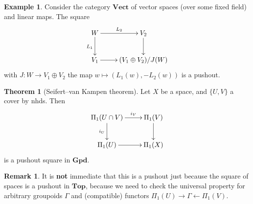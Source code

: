 \documentclass{tufte-handout}
\def\Top {\mathbf{Top}}
\def\Gpd {\mathbf{Gpd}}
\def\Vect {\mathbf{Vect}}
\theoremstyle{definition}
\newtheorem{example}{Example}
\newtheorem{theorem}{Theorem}
\newtheorem*{rem}{Remark}
\begin{document}
\begin{example}
Consider the category $\Vect$ of vector spaces (over some fixed field) and linear maps. The square
\[
	\xymatrix{
		W\ar[r]^{L_2} \ar[d]_{L_1} & V_2 \ar[d] \\
		V_1 \ar[r] & (V_1\oplus V_2)/J(W)
	}
\]
with $J\colon W\to V_1\oplus V_2$ the map $w\mapsto (L_1(w),-L_2(w))$ is a pushout.
\end{example}


\begin{theorem}[Seifert--van Kampen theorem]
Let $X$ be a space, and $\{U,V\}$ a cover by nhds. Then
\[
	\xymatrix{
		\Pi_1(U\cap V) \ar[r]^-{i_V} \ar[d]_{i_U} & \Pi_1(V) \ar[d]\\
		\Pi_1(U) \ar[r] & \Pi_1(X)
	}
\]
is a pushout square in $\Gpd$.
\end{theorem}

\begin{rem}
It is \textbf{not} immediate that this is a pushout just because the square of spaces is 
a pushout in $\Top$, because we need to check the universal property for arbitrary 
groupoids $\Gamma$ and (compatible) functors $\Pi_1(U) \to \Gamma \leftarrow \Pi_1(V)$.
\end{rem}
\end{document}
